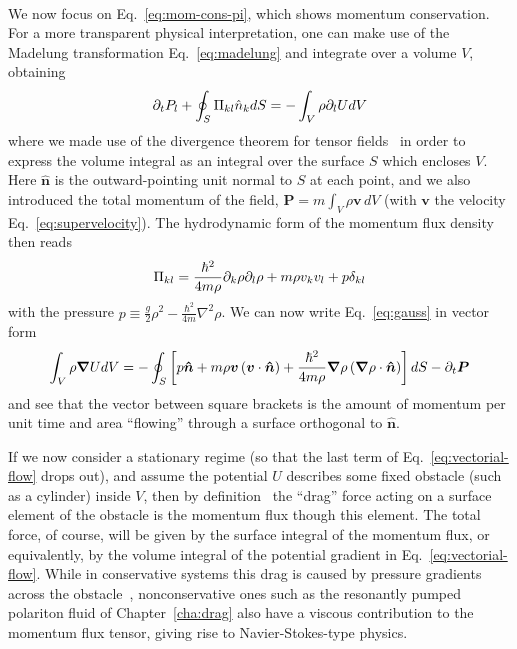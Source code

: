\begin{subappendices}
\begin{align}
\end{align}
%
We now focus on Eq.~\eqref{eq:mom-cons-pi}, which shows momentum
conservation. For a more transparent physical interpretation, one can
make use of the Madelung transformation Eq.~\eqref{eq:madelung} and
integrate over a volume $V$, obtaining
%
\begin{equation}\label{eq:gauss}
  \partial_t P_l  + \oint_S \Pi_{k l} \hat{n}_k d S  = -\int_{V}  \rho \partial_{l} U dV
\end{equation}
% 
where we made use of the divergence theorem for tensor
fields~\cite{the_brick} in order to express the volume integral as an
integral over the surface $S$ which encloses $V$. Here $\bm{\hat{n}}$
is the outward-pointing unit normal to $S$ at each point, and we also
introduced the total momentum of the field,
$\bm{P} = m \int_{V} \rho \bm{v}\, dV$ (with $\bm{v}$ the velocity
Eq.~\eqref{eq:supervelocity}). The hydrodynamic form of the momentum
flux density then reads
%
\begin{equation}\label{eq:pressure}
  \Pi_{k l} = \frac{\hbar^2}{4m\rho} \partial_k\rho \partial_l\rho + m\rho v_k v_l + p\delta_{k l}
\end{equation}
% 
with the pressure
$p \equiv \frac{g}{2}\rho^2 - \frac{\hbar^2}{4m} \nabla^2 \rho$. We
can now write Eq.~\eqref{eq:gauss} in vector form
%
\begin{equation}\label{eq:vectorial-flow}
  \int_{V}  \rho \bm{\nabla} U dV = - \oint_S \left[ p \bm{\hat{n}} + m\rho \bm{v} \left(\bm{v} \cdot \bm{\hat{n}}\right) + \frac{\hbar^2}{4m\rho}\bm{\nabla}\rho \left(\bm{\nabla}\rho \cdot \bm{\hat{n}}\right)  \right] d S - \partial_t \bm{P}
\end{equation}
% 
and see that the vector between square brackets is the amount of
momentum per unit time and area ``flowing'' through a surface
orthogonal to $\bm{\hat{n}}$.

If we now consider a stationary regime (so that the last term of
Eq.~\eqref{eq:vectorial-flow} drops out), and assume the potential $U$
describes some fixed obstacle (such as a cylinder) inside $V$, then by
definition~\cite{Landau:111625} the ``drag'' force acting on a surface
element of the obstacle is the momentum flux though this element. The
total force, of course, will be given by the surface integral of the
momentum flux, or equivalently, by the volume integral of the
potential gradient in Eq.~\eqref{eq:vectorial-flow}. While in
conservative systems this drag is caused by pressure gradients across
the obstacle~\cite{PhysRevLett.82.5186}, nonconservative ones such as
the resonantly pumped polariton fluid of Chapter~\ref{cha:drag} also
have a viscous contribution to the momentum flux tensor, giving rise
to Navier-Stokes-type physics.

\end{subappendices}

